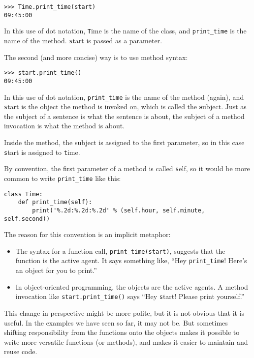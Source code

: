 \documentclass[
DIV=11,
fontsize=13,
twoside,
headinclude=false,
titlepage=firstiscover,
abstract=true,
headsepline=true,
footsepline=true,
chapterprefix=true, %
headings=big,
bibliography=totoc,%
captions=tableheading
]{scrbook}
\theoremstyle{definition}
\begin{document}
\begin{lstlisting}
>>> Time.print_time(start)
09:45:00
\end{lstlisting}
%
In this use of dot notation, {\texttt Time} is the name of the class,
and \verb"print_time" is the name of the method.  {\texttt start} is
passed as a parameter.

The second (and more concise) way is to use method syntax:

\begin{lstlisting}
>>> start.print_time()
09:45:00
\end{lstlisting}
%
In this use of dot notation, \verb"print_time" is the name of the
method (again), and {\texttt start} is the object the method is
invoked on, which is called the {\textbf subject}.  Just as the
subject of a sentence is what the sentence is about, the subject
of a method invocation is what the method is about.

Inside the method, the subject is assigned to the first
parameter, so in this case {\texttt start} is assigned
to {\texttt time}.

By convention, the first parameter of a method is
called {\texttt self}, so it would be more common to write
\verb"print_time" like this:

\begin{lstlisting}
class Time:
    def print_time(self):
        print('%.2d:%.2d:%.2d' % (self.hour, self.minute, self.second))
\end{lstlisting}
%
The reason for this convention is an implicit metaphor:

\begin{itemize}

\item The syntax for a function call, \verb"print_time(start)",
  suggests that the function is the active agent.  It says something
  like, ``Hey \verb"print_time"!  Here's an object for you to print.''

\item In object-oriented programming, the objects are the active
  agents.  A method invocation like \verb"start.print_time()" says
  ``Hey {\texttt start}!  Please print yourself.''

\end{itemize}

This change in perspective might be more polite, but it is not obvious
that it is useful.  In the examples we have seen so far, it may not
be.  But sometimes shifting responsibility from the functions onto the
objects makes it possible to write more versatile functions (or
methods), and makes it easier to maintain and reuse code.
\end{document}
